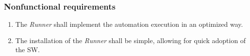 \subsubsection{Nonfunctional requirements}

\begin{enumerate}[label=\thesubsection.2.\arabic*]
    \item The \textit{Runner} shall implement the automation execution in an optimized way.
    \item The installation of the \textit{Runner} shall be simple, allowing for quick adoption of the \acl{SW}.
\end{enumerate}